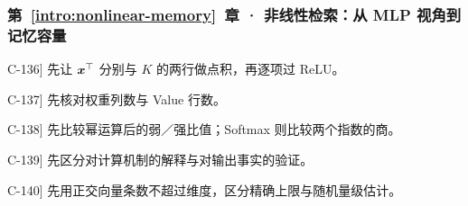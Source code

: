 \subsubsection*{第~\ref*{intro:nonlinear-memory}~章 · 非线性检索：从 MLP 视角到记忆容量}
\begin{answerhints}
\item[\hyperref[exercise:memory-relu-read]{C-136}] \leavevmode{}\label{hint:memory-relu-read}先让 $\boldsymbol{x}^\top$ 分别与 $K$ 的两行做点积，再逐项过 ReLU。
\item[\hyperref[exercise:memory-pairing-shape]{C-137}] \leavevmode{}\label{hint:memory-pairing-shape}先核对权重列数与 Value 行数。
\item[\hyperref[exercise:memory-selectivity]{C-138}] \leavevmode{}\label{hint:memory-selectivity}先比较幂运算后的弱／强比值；Softmax 则比较两个指数的商。
\item[\hyperref[exercise:memory-mlp-interpretation]{C-139}] \leavevmode{}\label{hint:memory-mlp-interpretation}先区分对计算机制的解释与对输出事实的验证。
\item[\hyperref[exercise:memory-random-capacity]{C-140}] \leavevmode{}\label{hint:memory-random-capacity}先用正交向量条数不超过维度，区分精确上限与随机量级估计。
\end{answerhints}
